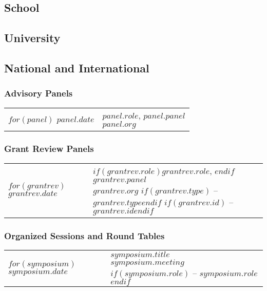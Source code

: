 \documentclass[martgin, line]{article}
\begin{document}
\subsection*{School}

\subsection*{University}

\subsection*{National and International}

\subsubsection*{Advisory Panels}
\setlength{\extrarowheight}{.75em}
\begin{tabular}{lp{5.5in}}   
$for(panel)$
$panel.date$&
\parbox[t]{5.5in}{$panel.role$, $panel.panel$\\
  \textit{$panel.org$}}\\
$endfor$
\end{tabular}
\setlength{\extrarowheight}{0em}

\subsubsection*{Grant Review Panels}
\setlength{\extrarowheight}{.75em}
\begin{tabular}{lp{5.5in}}   
$for(grantrev)$
$grantrev.date$&
\parbox[t]{5.5in}{
  $if(grantrev.role)$$grantrev.role$, $endif$ 
  $grantrev.panel$\\
  \textit{$grantrev.org$}
  $if(grantrev.type)$ -- \textit{$grantrev.type$}$endif$
  $if(grantrev.id)$ -- \textit{$grantrev.id$}$endif$
  }\\
$endfor$
\end{tabular}
\setlength{\extrarowheight}{0em}


\subsubsection*{Organized Sessions and Round Tables}
\setlength{\extrarowheight}{.75em}
\begin{tabular}{lp{5.5in}}   
$for(symposium)$
$symposium.date$&
\parbox[t]{5.5in}{
    $symposium.title$\\
  \textit{$symposium.meeting$}
  $if(symposium.role)$ -- $symposium.role$$endif$ 
  }\\
$endfor$
\end{tabular}
\setlength{\extrarowheight}{0em}
\end{document}

